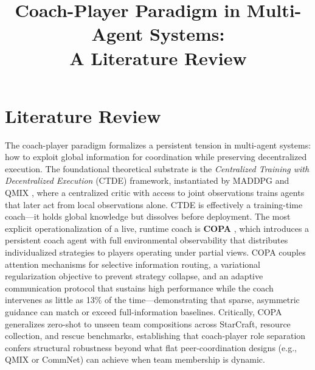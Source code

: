 \documentclass[12pt, a4paper]{article}
\title{Coach-Player Paradigm in Multi-Agent Systems:\\
A Literature Review}
\author{}
\date{}
\begin{document}
\maketitle

\section*{Literature Review}

The coach-player paradigm formalizes a persistent tension in multi-agent systems: how to exploit
global information for coordination while preserving decentralized execution. The foundational
theoretical substrate is the \textit{Centralized Training with Decentralized Execution} (CTDE)
framework, instantiated by MADDPG \parencite{lowe2017maddpg} and QMIX
\parencite{rashid2018qmix}, where a centralized critic with access to joint observations trains
agents that later act from local observations alone. CTDE is effectively a training-time
coach---it holds global knowledge but dissolves before deployment. The most explicit
operationalization of a live, runtime coach is \textbf{COPA} \parencite{liu2021copa}, which
introduces a persistent coach agent with full environmental observability that distributes
individualized strategies to players operating under partial views. COPA couples attention
mechanisms for selective information routing, a variational regularization objective to prevent
strategy collapse, and an adaptive communication protocol that sustains high performance while
the coach intervenes as little as 13\% of the time---demonstrating that sparse, asymmetric
guidance can match or exceed full-information baselines. Critically, COPA generalizes zero-shot
to unseen team compositions across StarCraft, resource collection, and rescue benchmarks,
establishing that coach-player role separation confers structural robustness beyond what flat
peer-coordination designs (e.g., QMIX or CommNet) can achieve when team membership is dynamic.
\end{document}
